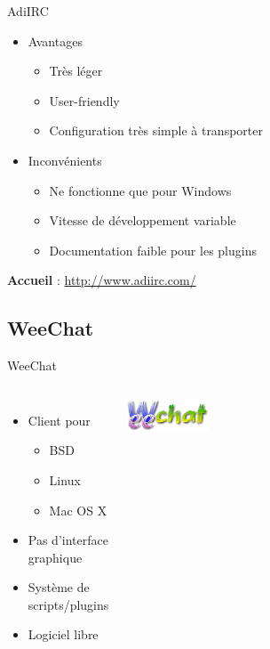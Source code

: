 \documentclass{beamer}
\begin{document}
\begin{frame}{AdiIRC}
\begin{itemize}	
	\itemsep1.3em
		\item Avantages
		\begin{itemize}
			\item Très léger
			\item User-friendly
			\item Configuration très simple à transporter
		\end{itemize}
		\item Inconvénients
		\begin{itemize}
			\item Ne fonctionne que pour Windows
			\item Vitesse de développement variable
			\item Documentation faible pour les plugins
		\end{itemize}
\end{itemize}
\begin{center}
	\textbf{Accueil} : \url{http://www.adiirc.com/}
\end{center}
\end{frame}

	\subsection{WeeChat} %
\begin{frame}{WeeChat}
\begin{columns}
		\begin{itemize}	
			\itemsep1.3em
				\item Client pour
				\begin{itemize}
					\item BSD
					\item Linux
					\item Mac OS X
				\end{itemize}
				\item Pas d'interface graphique
				\item Système de scripts/plugins
				\item Logiciel libre
		\end{itemize}
		\href{https://commons.wikimedia.org/wiki/File:Weechat_logo.png}{\hspace{3cm} \includegraphics[width=0.25\textwidth]{images/Weechat_logo.png}}
\end{columns}
\end{frame}
\end{document}
